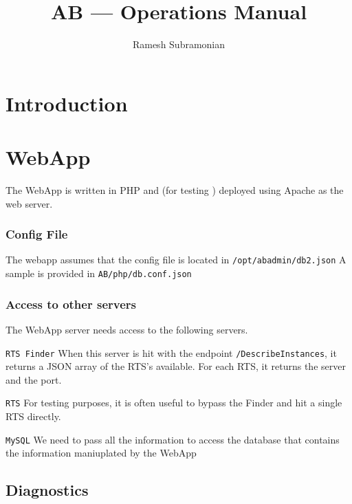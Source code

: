 \documentclass[letterpaper]{article}
\begin{document}
\title{AB --- Operations Manual}
\author{ Ramesh Subramonian }
\maketitle
\thispagestyle{fancy}
\lhead{}
\chead{}
\rhead{}
\cfoot{}
\rfoot{{\small \thepage}}
\section{Introduction}

\section{WebApp}

The WebApp is written in PHP and (for testing ) deployed using Apache 
as the web server. 

\subsubsection{Config File}

The webapp assumes that the config file is located in
\verb+/opt/abadmin/db2.json+ 
A sample is provided in \verb+AB/php/db.conf.json+

\subsubsection{Access to other servers}

The WebApp server needs access to the following servers. 
\be
\item {\tt RTS Finder} When this server is hit with the endpoint
  {\tt/DescribeInstances}, it returns a JSON array of the RTS's available. For
  each RTS, it returns the server and the port.
\item {\tt RTS} For testing purposes, it is often useful to bypass the Finder
  and hit a single RTS directly.
\item {\tt MySQL} We need to pass all the information to access the database
  that contains the information maniuplated by the WebApp
  \ee

\subsection{Diagnostics}
\end{document}
